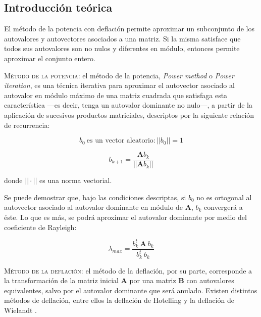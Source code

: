 
\vspace{1em}
\subsection{Introducción teórica} El método de la potencia con deflación permite aproximar un subconjunto de los autovalores y autovectores asociados a una matriz. Si la misma satisface que todos sus autovalores son no nulos y diferentes en módulo, entonces permite aproximar el conjunto entero. 


\vspace{2em}
\noindent \textsc{Método de la potencia}: el método de la potencia, \textit{Power method} o \textit{Power iteration}, es una técnica iterativa para aproximar el autovector asociado al autovalor en módulo máximo de una matriz cuadrada que satisfaga esta característica ---es decir, tenga un autovalor dominante no nulo---, a partir de la aplicación de sucesivos productos matriciales, descriptos por la siguiente relación de recurrencia:

\begin{equation*}
    b_0\ \text{es un vector aleatorio} : ||b_0|| = 1
\end{equation*}

\begin{equation} \label{potencia}
    b_{k+1} = \frac{\mathbf{A}b_k}{||\mathbf{A}b_k||}
\end{equation}

\vspace{1em}
\noindent donde $|| \cdot ||$ es una norma vectorial.

\vspace{1em}
Se puede demostrar \cite{Burden} que, bajo las condiciones descriptas, si $b_0$ no es ortogonal al autovector asociado al autovalor dominante en módulo de \textbf{A}, $b_k$ convergerá a éste. Lo que es más, se podrá aproximar el autovalor dominante por medio del coeficiente de Rayleigh:

\vspace{1em}
\begin{equation} \label{rayleigh}
    \lambda_{max} = \frac{b_k^t\ \mathbf{A}\ b_k}{b_k^t\ b_k}
\end{equation}


\vspace{3em}
\noindent \textsc{Método de la deflación}: el método de la deflación, por su parte, corresponde a la transformación de la matriz inicial \textbf{A} por una matriz \textbf{B} con autovalores equivalentes, salvo por el autovalor dominante que será anulado. Existen distintos métodos de deflación, entre ellos la deflación de Hotelling y la deflación de Wielandt \cite{Burden}.  

